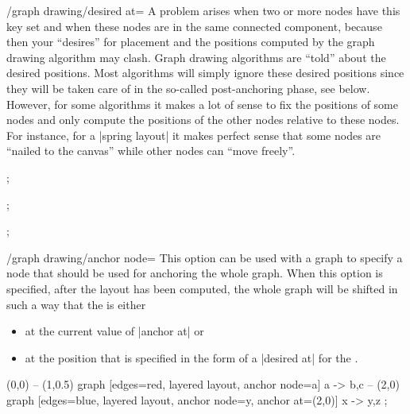 {\begin{key}{/graph drawing/desired at=}
  A problem arises when two or more nodes have this key set
  and when these nodes are in the same connected component, because
  then your ``desires'' for placement and the positions computed by
  the graph drawing algorithm may clash. Graph drawing algorithms are
  ``told'' about the desired positions. Most algorithms will simply
  ignore these desired positions since they will be taken care of in
  the so-called post-anchoring phase, see below. However, for some
  algorithms it makes a lot of sense to fix the positions of some
  nodes and only compute the positions 
  of the other nodes relative to these nodes. For instance, for a
  |spring layout| it makes perfect sense that some nodes are
  ``nailed to the canvas'' while other nodes can ``move freely''.
\begin{codeexample}[]
\tikz {};
\end{codeexample}
\begin{codeexample}[]
\tikz {};
\end{codeexample}
\begin{codeexample}[]
\tikz {};
\end{codeexample}
\end{key}


\begin{key}{/graph drawing/anchor node=}
  This option can be used with a graph to specify a node that should
  be used for anchoring the whole graph. When this option is
  specified, after the layout has been computed, the whole graph will
  be shifted in such a way that the  is either
  \begin{itemize}
  \item at the current value of |anchor at| or 
  \item at the position that is specified in the form of a
    |desired at| for the .
  \end{itemize}
\begin{codeexample}[]
\tikz \draw (0,0)
  -- (1,0.5) graph [edges=red,  layered layout, anchor node=a] { a -> {b,c} }
  -- (2,0)   graph [edges=blue, layered layout,
                    anchor node=y, anchor at={(2,0)}]          { x -> {y,z} };
\end{codeexample}
\begin{codeexample}[]
\end{codeexample}
\end{key}}
